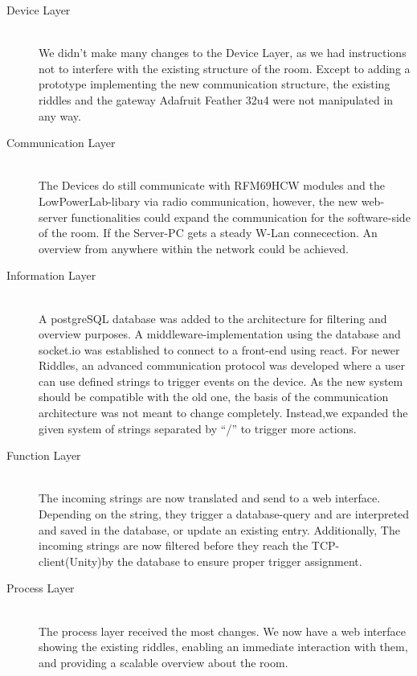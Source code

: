 \begin{description}
	\item[Device Layer]\hfill \\
	      We didn't make many changes to the Device Layer, as we had instructions not to interfere with the existing structure of the room.
	      Except to adding a prototype implementing the new communication structure, the existing riddles and the gateway Adafruit Feather 32u4 were not manipulated in any way.
	\item[Communication Layer]\hfill \\
	      The Devices do still communicate with RFM69HCW modules and the LowPowerLab-libary via radio communication,
	      however, the new web-server functionalities could expand the communication for the software-side of the room. If the Server-PC gets a steady W-Lan connecection.
	      An overview from anywhere within the network could be achieved.
	\item[Information Layer]\hfill \\
	      A postgreSQL database was added to the architecture for filtering and overview purposes.
	      A middleware-implementation using the database and socket.io was established to connect to a front-end using react.
	      For newer Riddles, an advanced communication protocol was developed where a user can use defined strings to trigger events on the device.
	      As the new system should be compatible with the old one, the basis of the communication architecture was not meant to change completely.
	      Instead,we expanded the given system of strings separated by “/” to trigger more actions.
	\item[Function Layer]\hfill \\
	      The incoming strings are now translated and send to a web interface.
	      Depending on the string, they trigger a database-query and are interpreted and saved in the database, or update an existing entry.
	      Additionally, The incoming strings are now filtered before they reach the TCP-client(Unity)by the database to ensure proper trigger assignment.
	\item[Process Layer]\hfill \\
	      The process layer received the most changes.
	      We now have a web interface showing the existing riddles, enabling an immediate interaction with them, and providing a scalable overview about the room.

\end{description}

